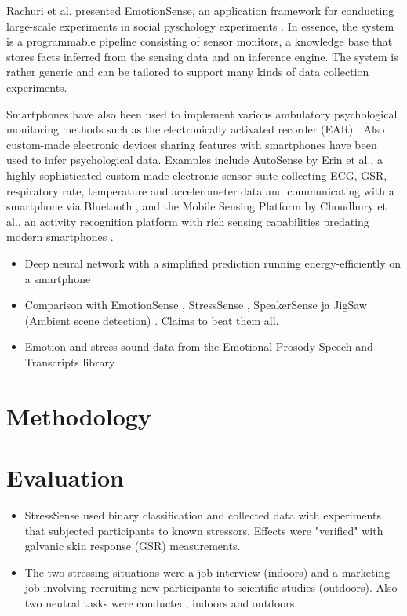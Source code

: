 Rachuri et al. presented EmotionSense, an application framework for conducting
large-scale experiments in social pyschology experiments
\cite{rachuri10emotionsense}.
In essence, the system is a programmable pipeline consisting of sensor monitors,
a knowledge base that stores facts inferred from the sensing data and an
inference engine. The system is rather generic and can be tailored to
support many kinds of data collection experiments.

Smartphones have also been used to implement various ambulatory psychological
monitoring methods such as the electronically activated recorder (EAR)
\cite{mehl12naturalistic}. Also custom-made electronic devices sharing features
with smartphones have been used to infer psychological data. Examples include
AutoSense by Erin et al., a highly sophisticated custom-made electronic sensor
suite collecting ECG, GSR, respiratory rate, temperature and accelerometer
data and communicating with a smartphone via Bluetooth
\cite{ertin11autosense}, and the Mobile Sensing Platform by Choudhury et al.,
an activity recognition platform with rich sensing capabilities predating modern
smartphones \cite{choudhury08msp}.

\begin{itemize}
  \item Deep neural network with a simplified prediction running
    energy-efficiently on a smartphone
    \cite{lane15deepear}
  \item Comparison with EmotionSense \cite{rachuri10emotionsense},
    StressSense \cite{lu12stresssense}, SpeakerSense
    \cite{lu11speakersense} ja JigSaw (Ambient scene detection)
    \cite{lu10jigsaw}. Claims to beat them all.
  \item Emotion and stress sound data from the Emotional Prosody Speech and
    Transcripts library \cite{??emotional}
\end{itemize}

\section{Methodology}

\section{Evaluation}

\begin{itemize}
  \item StressSense \cite{lu12stresssense} used binary classification and
    collected data with experiments that subjected participants to known
    stressors.  Effects were "verified" with galvanic skin response (GSR)
    measurements.
  \item The two stressing situations were a job interview (indoors) and a
    marketing job involving recruiting new participants to scientific studies
    (outdoors). Also two neutral tasks were conducted, indoors and outdoors.
\end{itemize}

